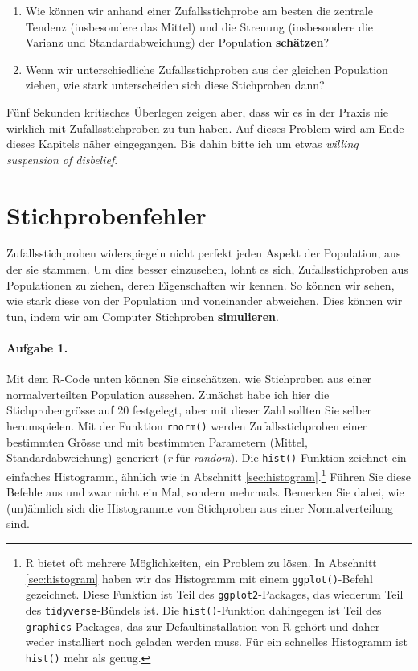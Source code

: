 \documentclass[oneside, 10pt]{book}\usepackage[]{graphicx}\usepackage[]{xcolor}
\begin{document}
\begin{enumerate}
\item Wie können wir anhand einer Zufallsstichprobe am
besten die zentrale Tendenz (insbesondere das Mittel)
und die Streuung (insbesondere die Varianz und Standardabweichung)
der Population \textbf{schätzen}?

\item Wenn wir unterschiedliche Zufallsstichproben aus
der gleichen Population ziehen, wie stark unterscheiden
sich diese Stichproben dann?
\end{enumerate}

Fünf Sekunden kritisches Überlegen zeigen aber, dass wir es in der Praxis
nie wirklich mit Zufallsstichproben zu tun haben. Auf dieses Problem
wird am Ende dieses Kapitels näher
eingegangen. Bis dahin bitte ich um etwas \textit{willing suspension of disbelief}.

\section{Stichprobenfehler}
Zufallsstichproben widerspiegeln nicht perfekt
jeden Aspekt der Population, aus der sie stammen.
Um dies besser einzusehen, lohnt es sich,
Zufallsstichproben aus Populationen zu ziehen,
deren Eigenschaften wir kennen. So können wir sehen,
wie stark diese von der Population und voneinander
abweichen. Dies können wir tun, indem wir
am Computer Stichproben \textbf{simulieren}.

\paragraph{Aufgabe 1.}
Mit dem R-Code unten können Sie einschätzen,
wie Stichproben aus einer normalverteilten
Population aussehen. Zunächst habe ich hier
die Stichprobengrösse auf 20 festgelegt,
aber mit dieser Zahl sollten Sie selber
herumspielen. Mit der Funktion \texttt{rnorm()}
werden Zufallsstichproben einer bestimmten Grösse
und mit bestimmten Parametern (Mittel, Standardabweichung)
generiert (\textit{r} für \textit{random}).
Die \texttt{hist()}-Funktion zeichnet ein
einfaches Histogramm, ähnlich wie in Abschnitt \ref{sec:histogram}.\footnote{R bietet oft mehrere Möglichkeiten, ein Problem zu lösen. In Abschnitt \ref{sec:histogram} haben wir das Histogramm mit einem \texttt{ggplot()}-Befehl gezeichnet. Diese Funktion ist Teil des \texttt{ggplot2}-Packages, das wiederum Teil des \texttt{tidyverse}-Bündels ist. Die \texttt{hist()}-Funktion dahingegen ist Teil des \texttt{graphics}-Packages, das zur Defaultinstallation von R gehört und daher weder installiert noch geladen werden muss. Für ein schnelles Histogramm ist \texttt{hist()} mehr als genug.}
Führen Sie diese Befehle aus und zwar nicht ein Mal, sondern
mehrmals. Bemerken Sie dabei, wie (un)ähnlich
sich die Histogramme von Stichproben aus einer Normalverteilung sind.
\end{document}
